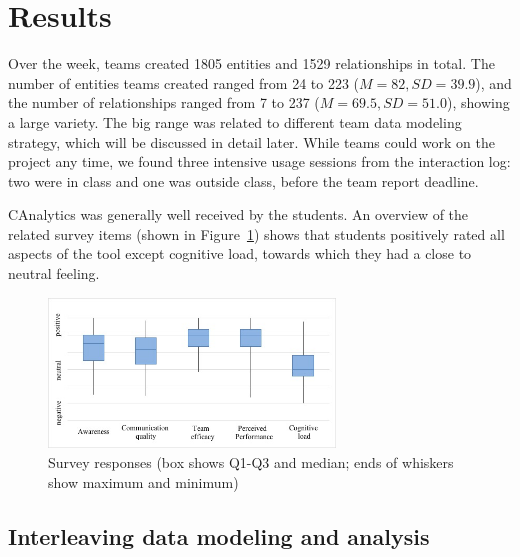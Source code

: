\section{Results}\label{results}

Over the week, teams created 1805 entities and 1529 relationships in
total. The number of entities teams created ranged from 24 to 223 ($M=82,
SD=39.9$), and the number of relationships ranged from 7 to 237 ($M=69.5,
SD=51.0$), showing a large variety. The big range was related to different team data modeling strategy,
which will be discussed in detail later. While teams could work on the project any time, we found three intensive usage sessions from the interaction log: two were in class and one was outside class, before the team report deadline.

CAnalytics was generally well received by the students. An overview of 
the related survey items (shown in Figure~\ref{fig:survey}) shows that students positively rated all aspects
of the tool except cognitive load, towards which they had a close to neutral feeling. %

\begin{figure}
\centering
\includegraphics[width=3.00000in]{./img/survey_boxchart.jpg}
\caption{Survey responses (box shows Q1-Q3 and median; ends of whiskers show
maximum and minimum)\label{fig:survey}}
\end{figure}

\subsection{Interleaving data modeling and analysis}\label{interleaving-data-modeling-and-data-analysis}



